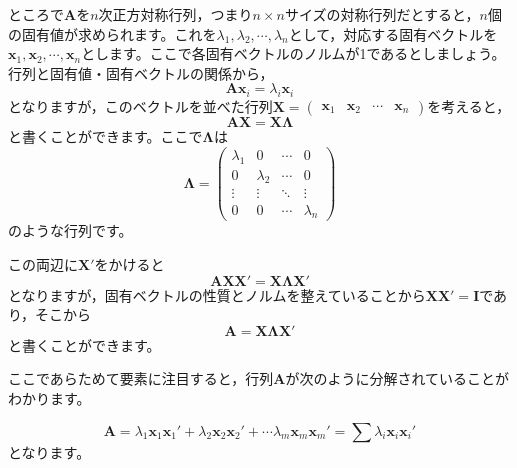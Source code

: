 \documentclass{ltjsbook}
\begin{document}
ところで$\bm{A}$を$n$次正方対称行列，つまり$n \times n$サイズの対称行列だとすると，$n$個の固有値が求められます。これを$\lambda_1,\lambda_2,\cdots,\lambda_n$として，対応する固有ベクトルを$\bm{x}_1,\bm{x}_2,\cdots,\bm{x}_n$とします。ここで各固有ベクトルのノルムが1であるとしましょう。行列と固有値・固有ベクトルの関係から，
\[ \bm{Ax}_i = \lambda_i\bm{x}_i\]
となりますが，このベクトルを並べた行列$\bm{X}=\begin{pmatrix}\bm{x}_1&\bm{x}_2& \cdots & \bm{x}_n\end{pmatrix}$を考えると，
\[ \bm{AX} = \bm{X \Lambda} \]
と書くことができます。ここで$\bm{\Lambda}$は
\[ \bm{\Lambda} =
	\begin{pmatrix} \lambda_1 & 0         & \cdots & 0         \\
                0         & \lambda_2 & \cdots & 0         \\
                \vdots    & \vdots    & \ddots & \vdots    \\
                0         & 0         & \cdots & \lambda_n\end{pmatrix}
\]
のような行列です。

この両辺に$\bm{X}'$をかけると
\[ \bm{AXX}' = \bm{X \Lambda X}' \]
となりますが，固有ベクトルの性質とノルムを整えていることから$\bm{XX}'=\bm{I}$であり，そこから
\[ \bm{A} = \bm{X \Lambda X}' \]
と書くことができます。

ここであらためて要素に注目すると，行列$\bm{A}$が次のように分解されていることがわかります。

\[
	\bm{A}= \lambda_1 \bm{x}_1 \bm{x}_1' + \lambda_2 \bm{x}_2 \bm{x}_2' + \cdots \lambda_m \bm{x}_m \bm{x}_m'= \sum \lambda_{i} \bm{x}_{i} \bm{x}_i'
\]
となります。
\end{document}
